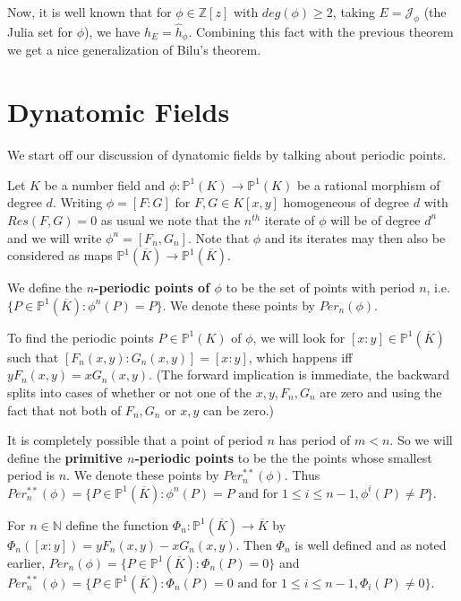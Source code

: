 \documentclass{amsart}
\newcommand{\N}{\mathbb{N}}
\newcommand{\Z}{\mathbb{Z}}
\renewcommand{\P}{\mathbb{P}}
\newcommand{\MCJ}{\mathcal{J}}
\begin{document}
Now, it is well known that for $\phi \in \Z[z]$ with $deg(\phi) \geq 2$, taking $E = \MCJ_{\phi}$ (the Julia set for $\phi$), we have $h_E = \hat{h}_{\phi}$. Combining this fact with the previous theorem we get a nice generalization of Bilu's theorem. 



\section{Dynatomic Fields} 
 
We start off our discussion of dynatomic fields by talking about periodic points. 

Let $K$ be a number field and $\phi: \P^1(K) \rightarrow \P^1(K)$ be a rational morphism of degree $d$. Writing $\phi = [F:G]$ for $F,G \in K[x,y]$ homogeneous of degree $d$ with $Res(F,G)=0$ as usual we note that the $n^{th}$ iterate of $\phi$ will be of degree $d^n$ and we will write $\phi^n = [F_n,G_n]$. Note that $\phi$ and its iterates may then also be considered as maps $\P^1(\overline{K}) \rightarrow \P^1(\overline{K})$.

We define the \textbf{$n$-periodic points of $\phi$} to be the set of points with period $n$, i.e. $\{P \in \P^1(\overline{K}): \phi^n(P) = P \}$. We denote these points by $Per_n(\phi)$.

To find the periodic points $P \in \P^1(K)$ of $\phi$, we will look for $[x:y] \in \P^1(\overline{K})$ such that $[F_n(x,y):G_n(x,y)] = [x:y]$, which happens iff $yF_n(x,y) = xG_n(x,y)$. (The forward implication is immediate, the backward splits into cases of whether or not one of the $x,y,F_n,G_n$ are zero and using the fact that not both of $F_n,G_n$ or $x,y$ can be zero.)

It is completely possible that a point of period $n$ has period of $m<n$. So we will define the \textbf{primitive $n$-periodic points} to be the the points whose smallest period is $n$. We denote these points by $Per_n^{**}(\phi)$. Thus $Per_n^{**}(\phi) = \{P \in \P^1(\overline{K}): \phi^n(P) = P \text{ and for } 1\leq i \leq n-1, \phi^i(P) \neq P\}$.

For $n \in \N$ define the function $\Phi_n: \P^1(\overline{K}) \rightarrow \overline{K}$ by $\Phi_n([x:y]) = yF_n(x,y) - xG_n(x,y)$. Then $\Phi_n$ is well defined and as noted earlier, $Per_n(\phi) = \{P \in \P^1(\overline{K}): \Phi_n(P) = 0\}$ and $Per_n^{**}(\phi) = \{P \in \P^1(\overline{K}): \Phi_n(P) = 0 \text{ and for } 1\leq i \leq n-1, \Phi_i(P) \neq 0\}$. 
\end{document}

